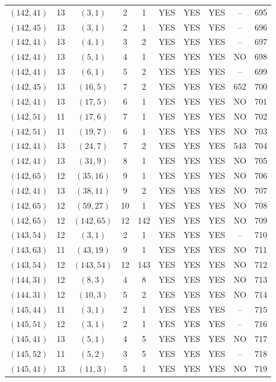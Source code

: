 \begin{longtable}{|c|c|c|c|c|c|c|c|c|c|}
$(142, 41)$ & 13 & $(3, 1)$ & 2 & 1 & YES & YES & YES & -- & 695\\
$(142, 45)$ & 13 & $(3, 1)$ & 2 & 1 & YES & YES & YES & -- & 696\\
$(142, 41)$ & 13 & $(4, 1)$ & 3 & 2 & YES & YES & YES & -- & 697\\
$(142, 41)$ & 13 & $(5, 1)$ & 4 & 1 & YES & YES & YES & NO & 698\\
$(142, 41)$ & 13 & $(6, 1)$ & 5 & 2 & YES & YES & YES & -- & 699\\
$(142, 45)$ & 13 & $(16, 5)$ & 7 & 2 & YES & YES & YES & 652 & 700\\
$(142, 41)$ & 13 & $(17, 5)$ & 6 & 1 & YES & YES & YES & NO & 701\\
$(142, 51)$ & 11 & $(17, 6)$ & 7 & 1 & YES & YES & YES & NO & 702\\
$(142, 51)$ & 11 & $(19, 7)$ & 6 & 1 & YES & YES & YES & NO & 703\\
$(142, 41)$ & 13 & $(24, 7)$ & 7 & 2 & YES & YES & YES & 543 & 704\\
$(142, 41)$ & 13 & $(31, 9)$ & 8 & 1 & YES & YES & YES & NO & 705\\
$(142, 65)$ & 12 & $(35, 16)$ & 9 & 1 & YES & YES & YES & NO & 706\\
$(142, 41)$ & 13 & $(38, 11)$ & 9 & 2 & YES & YES & YES & NO & 707\\
$(142, 65)$ & 12 & $(59, 27)$ & 10 & 1 & YES & YES & YES & NO & 708\\
$(142, 65)$ & 12 & $(142, 65)$ & 12 & 142 & YES & YES & YES & NO & 709\\
$(143, 54)$ & 12 & $(3, 1)$ & 2 & 1 & YES & YES & YES & -- & 710\\
$(143, 63)$ & 11 & $(43, 19)$ & 9 & 1 & YES & YES & YES & NO & 711\\
$(143, 54)$ & 12 & $(143, 54)$ & 12 & 143 & YES & YES & YES & NO & 712\\
$(144, 31)$ & 12 & $(8, 3)$ & 4 & 8 & YES & YES & YES & NO & 713\\
$(144, 31)$ & 12 & $(10, 3)$ & 5 & 2 & YES & YES & YES & NO & 714\\
$(145, 44)$ & 11 & $(3, 1)$ & 2 & 1 & YES & YES & YES & -- & 715\\
$(145, 51)$ & 12 & $(3, 1)$ & 2 & 1 & YES & YES & YES & -- & 716\\
$(145, 41)$ & 13 & $(5, 1)$ & 4 & 5 & YES & YES & YES & NO & 717\\
$(145, 52)$ & 11 & $(5, 2)$ & 3 & 5 & YES & YES & YES & -- & 718\\
$(145, 41)$ & 13 & $(11, 3)$ & 5 & 1 & YES & YES & YES & NO & 719\\

\end{longtable}
